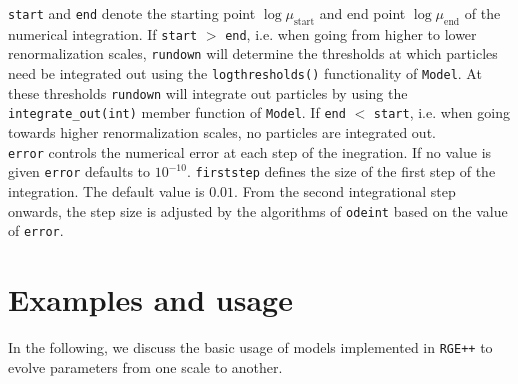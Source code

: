 \documentclass[11pt,a4paper]{article}
\begin{document}
\texttt{start} and \texttt{end} denote the starting point $\log\mu_{\mathrm{start}}$ and end point $\log\mu_{\mathrm{end}}$ of the numerical integration. If \texttt{start} $>$ \texttt{end}, i.e. when going from higher to lower renormalization scales, \texttt{rundown} will determine the thresholds at which particles need be integrated out using the \texttt{logthresholds()} functionality of \texttt{Model}. At these thresholds \texttt{rundown} will integrate out particles by using the \texttt{integrate\_out(int)} member function of \texttt{Model}. If \texttt{end} $<$ \texttt{start}, i.e. when going towards higher renormalization scales, no particles are integrated out.\\
\texttt{error} controls the numerical error at each step of the inegration. If no value is given \texttt{error} defaults to $10^{-10}$. \texttt{firststep} defines the size of the first step of the integration. The default value is $0.01$. From the second integrational step onwards, the step size is adjusted by the algorithms of \texttt{odeint} based on the value of \texttt{error}.

\section{\label{sec::examples}Examples and usage}
In the following, we discuss the basic usage of models implemented in \texttt{RGE++} to evolve parameters from one scale to another.
\end{document}
